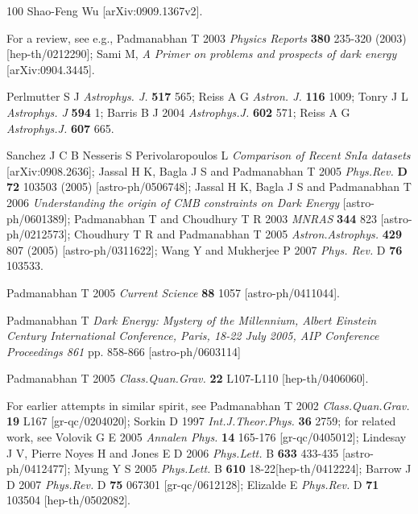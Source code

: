 \documentclass[12pt]{iopart}
\begin{document}
\begin{thebibliography}{100}
Shao-Feng Wu  [arXiv:0909.1367v2].

 
For a review, see e.g., 
Padmanabhan T  2003 \textit{Physics Reports} \textbf{380} 235-320 (2003) [hep-th/0212290];
Sami M, \textit{A Primer on problems and prospects of dark energy} [arXiv:0904.3445]. 


Perlmutter S J   \textit{Astrophys. J.}  \textbf{517} 565;
Reiss A G  \textit{Astron. J.}  \textbf{116} 1009;
Tonry J L  \textit{Astrophys. J}  {\bf 594} 1;
Barris B J 2004 \textit{Astrophys.J.} \textbf{602}  571;
Reiss A G  \textit{Astrophys.J.} \textbf{607} 665.


Sanchez J C B Nesseris S Perivolaropoulos L \textit{Comparison of Recent SnIa datasets} [arXiv:0908.2636];
Jassal  H K, Bagla J S and Padmanabhan T   2005
     \textit{ Phys.Rev.} \textbf{D 72} 103503 (2005) [astro-ph/0506748];
Jassal  H K, Bagla J S and Padmanabhan T   2006 
     \textit{Understanding the origin of CMB constraints on Dark Energy} [astro-ph/0601389];
Padmanabhan T and Choudhury  T R 2003  
      \textit{MNRAS} {\bf 344} 823  [astro-ph/0212573];
Choudhury T R and Padmanabhan T 2005 
      \textit{Astron.Astrophys.} \textbf{429} 807 (2005) [astro-ph/0311622];
Wang Y and  Mukherjee P  2007 \textit{Phys. Rev.} D \textbf{76} 103533.


Padmanabhan T  2005 \textit{Current Science}  \textbf{88} 1057 [astro-ph/0411044]. 

Padmanabhan T  \textit{Dark Energy: Mystery of the Millennium,  Albert Einstein Century International Conference, Paris, 18-22 July 2005, AIP Conference Proceedings  861} pp. 858-866 [astro-ph/0603114]

Padmanabhan T   2005  \textit{Class.Quan.Grav.} \textbf{22} L107-L110 [hep-th/0406060]. 

For earlier attempts in similar spirit, see
    Padmanabhan T 2002 \textit{Class.Quan.Grav.}  \textbf{19} L167  [gr-qc/0204020]; 
    Sorkin D  1997 \textit{Int.J.Theor.Phys.} \textbf{36} 2759; 
for related work, see
    Volovik G E 2005 \textit{Annalen Phys.} \textbf{14}  165-176 [gr-qc/0405012];
    Lindesay J V,  Pierre Noyes H and  Jones E D  2006 \textit{Phys.Lett.} B \textbf{633}             433-435 [astro-ph/0412477];
    Myung Y S  2005 \textit{Phys.Lett.} B \textbf{610}  18-22[hep-th/0412224];
    Barrow  J D 2007 \textit{Phys.Rev.} D \textbf{75} 067301 [gr-qc/0612128];
    Elizalde E  \textit{Phys.Rev.} D \textbf{71} 103504 [hep-th/0502082].




\end{thebibliography}
\end{document}
